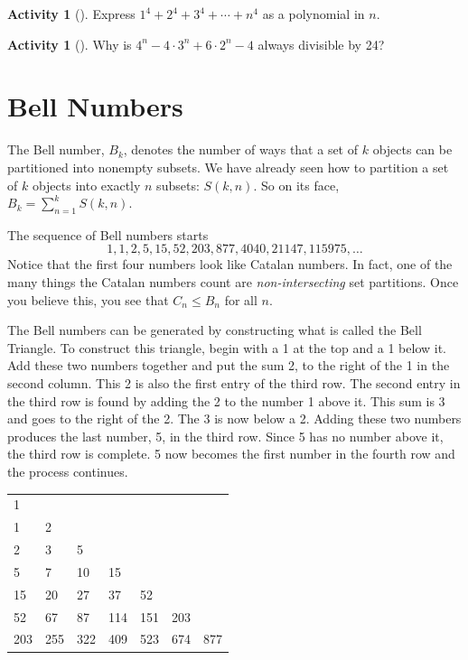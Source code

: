 \documentclass[10pt,]{book}
\theoremstyle{plain}
\theoremstyle{definition}
\theoremstyle{definition}
\theoremstyle{definition}
\newtheorem{activity}[project]{Activity}
\numberwithin{equation}{chapter}
\begin{document}
\begin{activity}[]\label{activity-288}
\hypertarget{p-1465}{}%
Express \(1^4 + 2^4 + 3^4 + \cdots + n^4\) as a polynomial in \(n\).%
\end{activity}
\begin{activity}[]\label{activity-289}
\hypertarget{p-1466}{}%
Why is \(4^n - 4\cdot 3^n + 6\cdot 2^n - 4\) always divisible by 24?%
\end{activity}
\typeout{************************************************}
\typeout{************************************************}
\section[{Bell Numbers}]{Bell Numbers}\label{sec_adv-bell}
\hypertarget{p-1467}{}%
The Bell number, \(B_{k}\), denotes the number of ways that a set of \(k\) objects can be partitioned into nonempty subsets. We have already seen how to partition a set of \(k\) objects into exactly \(n\) subsets: \(S(k,n)\).  So on its face, \(B_k = \sum_{n=1}^kS(k,n)\).%
\par
\hypertarget{p-1468}{}%
The sequence of Bell numbers starts%
\begin{equation*}
1, 1, 2, 5, 15, 52, 203, 877, 4040, 21147, 115975, \ldots
\end{equation*}
Notice that the first four numbers look like Catalan numbers.  In fact, one of the many things the Catalan numbers count are \emph{non-intersecting} set partitions.  Once you believe this, you see that \(C_n \le B_n\) for all \(n\).%
\par
\hypertarget{p-1469}{}%
The Bell numbers can be generated by constructing what is called the Bell Triangle. To construct this triangle, begin with a 1 at the top and a 1 below it. Add these two numbers together and put the sum 2, to the right of the 1 in the second column. This 2 is also the first entry of the third row. The second entry in the third row is found by adding the 2 to the number 1 above it. This sum is 3 and goes to the right of the 2. The 3 is now below a 2. Adding these two numbers produces the last number, 5, in the third row. Since 5 has no number above it, the third row is complete. 5 now becomes the first number in the fourth row and the process continues.%
\begin{sidebyside}{1}{0.15}{0.15}{0}
\begin{sbspanel}{0.7}
{\centering%
\begin{tabular}{lllllll}
1&&&&&&\tabularnewline[0pt]
1&2&&&&&\tabularnewline[0pt]
2&3&5&&&&\tabularnewline[0pt]
5&7&10&15&&&\tabularnewline[0pt]
15&20&27&37&52&&\tabularnewline[0pt]
52&67&87&114&151&203&\tabularnewline[0pt]
203&255&322&409&523&674&877
\end{tabular}
\par}
\end{sbspanel}
\end{sidebyside}
\end{document}
